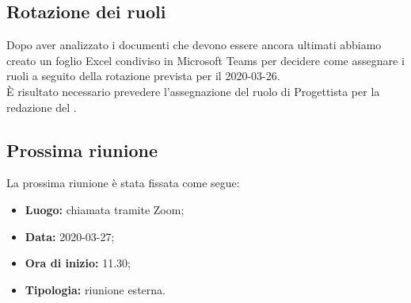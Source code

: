 	\subsection{Rotazione dei ruoli}
		Dopo aver analizzato i documenti che devono essere ancora ultimati abbiamo creato un foglio Excel condiviso in Microsoft Teams per decidere come assegnare i ruoli a seguito della rotazione prevista per il 2020-03-26. \\
		È risultato necessario prevedere l'assegnazione del ruolo di Progettista per la redazione del \PdQ.

	\subsection{Prossima riunione}
		La prossima riunione è stata fissata come segue: 
		\begin{itemize}
			\item \textbf{Luogo: } chiamata tramite Zoom; 
			\item \textbf{Data: } 2020-03-27; 
			\item \textbf{Ora di inizio: } 11.30;
			\item \textbf{Tipologia: } riunione esterna.
		\end{itemize}